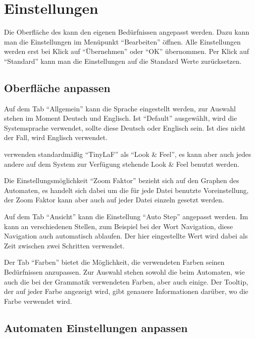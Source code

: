 \chapter{Einstellungen}

Die Oberfläche des \gtitools kann den eigenen Bedürfnissen angepasst werden.
Dazu kann man die Einstellungen im Menüpunkt "`Bearbeiten"' öffnen. Alle
Einstellungen werden erst bei Klick auf "`Übernehmen"' oder "`OK"' übernommen.
Per Klick auf "`Standard"' kann man die Einstellungen auf die Standard Werte
zurücksetzen.


\section{Oberfläche anpassen}

Auf dem Tab "`Allgemein"' kann die Sprache eingestellt werden, zur Auswahl
stehen im Moment Deutsch und Englisch. Ist "`Default"' ausgewählt, wird
die Systemsprache verwendet, sollte diese Deutsch oder Englisch sein. Ist dies
nicht der Fall, wird Englisch verwendet.\vspace{10pt}

\gtitool verwenden standardmäßig "`TinyLaF"' als "`Look \& Feel"', es kann aber
auch jedes andere auf dem System zur Verfügung stehende Look \& Feel benutzt
werden.\vspace{10pt}

Die Ein\-stell\-ungs\-möglich\-keit "`Zoom Faktor"' bezieht sich auf den Graphen 
des Automaten, es handelt sich dabei um die für jede Datei benutzte Voreinstellung,
der Zoom Faktor kann aber auch auf jeder Datei einzeln gesetzt werden.\vspace{10pt}

Auf dem Tab "`Ansicht"' kann die Einstellung "`Auto Step"' angepasst werden. Im
\gtitool kann an verschiedenen Stellen, zum Beispiel bei der Wort Navigation, diese
Navigation auch automatisch ablaufen. Der hier eingestellte Wert wird dabei
als Zeit zwischen zwei Schritten verwendet.\vspace{10pt}

Der Tab "`Farben"' bietet die Möglichkeit, die verwendeten Farben seinen
Be\-dürf\-nis\-sen anzupassen. Zur Auswahl stehen sowohl die beim Automaten, wie
auch die bei der Grammatik verwendeten Farben, aber auch einige. Der Tooltip,
der auf jeder Farbe angezeigt wird, gibt genauere Informationen darüber, wo
die Farbe verwendet wird.


\section{Automaten Einstellungen anpassen}

